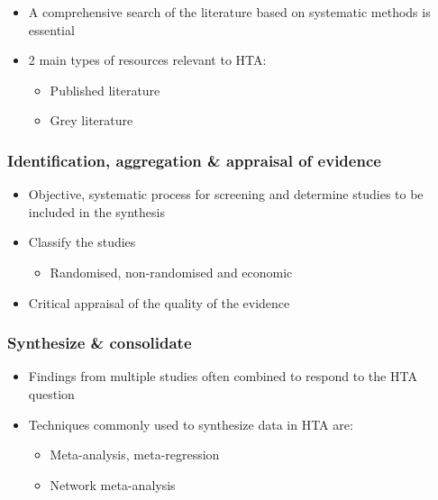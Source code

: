 \documentclass[
]{book}
\providecommand{\tightlist}{%
  \setlength{\itemsep}{0pt}\setlength{\parskip}{0pt}}
\begin{document}
\begin{itemize}
\tightlist
\item
  A comprehensive search of the literature based on systematic methods is essential
\item
  2 main types of resources relevant to HTA:

  \begin{itemize}
  \tightlist
  \item
    Published literature
  \item
    Grey literature
  \end{itemize}
\end{itemize}

\hypertarget{identification-aggregation-appraisal-of-evidence}{%
\subsubsection{Identification, aggregation \& appraisal of evidence}\label{identification-aggregation-appraisal-of-evidence}}

\begin{itemize}
\tightlist
\item
  Objective, systematic process for screening and determine studies to be included in the synthesis
\item
  Classify the studies

  \begin{itemize}
  \tightlist
  \item
    Randomised, non-randomised and economic
  \end{itemize}
\item
  Critical appraisal of the quality of the evidence
\end{itemize}

\hypertarget{synthesize-consolidate}{%
\subsubsection{Synthesize \& consolidate}\label{synthesize-consolidate}}

\begin{itemize}
\tightlist
\item
  Findings from multiple studies often combined to respond to the HTA question
\item
  Techniques commonly used to synthesize data in HTA are:

  \begin{itemize}
  \tightlist
  \item
    Meta-analysis, meta-regression
  \item
    Network meta-analysis
  \end{itemize}
\end{itemize}
\end{document}
